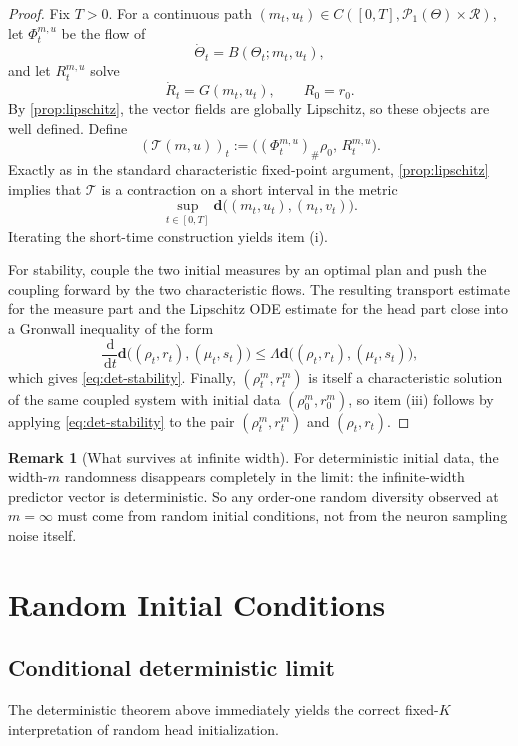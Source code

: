 \documentclass[11pt]{article}
\theoremstyle{definition}
\newtheorem{remark}[theorem]{Remark}
\newcommand{\PP}{\mathcal{P}}
\newcommand{\dd}{\,\mathrm{d}}
\begin{document}
\begin{proof}
Fix $T>0$. For a continuous path $(m_t,u_t)\in C([0,T],\PP_1(\Theta)\times\mathcal R)$, let $\Phi_t^{m,u}$ be the flow of
\[
  \dot\Theta_t = B(\Theta_t;m_t,u_t),
\]
and let $R_t^{m,u}$ solve
\[
  \dot R_t = G(m_t,u_t),
  \qquad
  R_0=r_0.
\]
By \cref{prop:lipschitz}, the vector fields are globally Lipschitz, so these objects are well defined. Define
\[
  (\mathcal T(m,u))_t
  :=
  \bigl(
    (\Phi_t^{m,u})_\#\rho_0,\,
    R_t^{m,u}
  \bigr).
\]
Exactly as in the standard characteristic fixed-point argument, \cref{prop:lipschitz} implies that $\mathcal T$ is a contraction on a short interval in the metric
\[
  \sup_{t\in[0,T]}
  \mathbf d\bigl((m_t,u_t),(n_t,v_t)\bigr).
\]
Iterating the short-time construction yields item (i).

For stability, couple the two initial measures by an optimal plan and push the coupling forward by the two characteristic flows. The resulting transport estimate for the measure part and the Lipschitz ODE estimate for the head part close into a Gronwall inequality of the form
\[
  \frac{\dd}{\dd t}
  \mathbf d\bigl((\rho_t,r_t),(\mu_t,s_t)\bigr)
  \le
  \Lambda
  \mathbf d\bigl((\rho_t,r_t),(\mu_t,s_t)\bigr),
\]
which gives \eqref{eq:det-stability}. Finally, $(\rho_t^m,r_t^m)$ is itself a characteristic solution of the same coupled system with initial data $(\rho_0^m,r_0^m)$, so item (iii) follows by applying \eqref{eq:det-stability} to the pair $(\rho_t^m,r_t^m)$ and $(\rho_t,r_t)$.
\end{proof}

\begin{remark}[What survives at infinite width]
For deterministic initial data, the width-$m$ randomness disappears completely in the limit: the infinite-width predictor vector is deterministic. So any order-one random diversity observed at $m=\infty$ must come from random initial conditions, not from the neuron sampling noise itself.
\end{remark}

\section{Random Initial Conditions}

\subsection{Conditional deterministic limit}

The deterministic theorem above immediately yields the correct fixed-$K$ interpretation of random head initialization.
\end{document}
